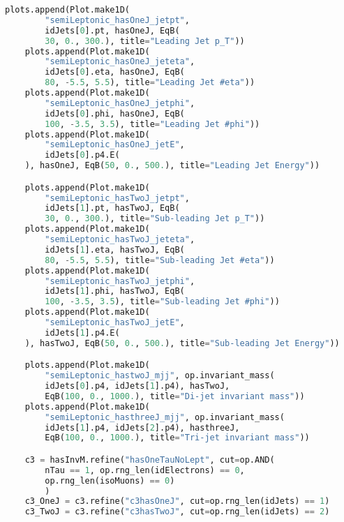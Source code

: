 \begin{lstlisting}[language=Python, caption=Python module of the analysis used in Bamboo framework, label={bamboocode}]
    plots.append(Plot.make1D(
        "semiLeptonic_hasOneJ_jetpt",
        idJets[0].pt, hasOneJ, EqB(
        30, 0., 300.), title="Leading Jet p_T"))
    plots.append(Plot.make1D(
        "semiLeptonic_hasOneJ_jeteta",
        idJets[0].eta, hasOneJ, EqB(
        80, -5.5, 5.5), title="Leading Jet #eta"))
    plots.append(Plot.make1D(
        "semiLeptonic_hasOneJ_jetphi",
        idJets[0].phi, hasOneJ, EqB(
        100, -3.5, 3.5), title="Leading Jet #phi"))
    plots.append(Plot.make1D(
        "semiLeptonic_hasOneJ_jetE",
        idJets[0].p4.E(
    ), hasOneJ, EqB(50, 0., 500.), title="Leading Jet Energy"))

    plots.append(Plot.make1D(
        "semiLeptonic_hasTwoJ_jetpt",
        idJets[1].pt, hasTwoJ, EqB(
        30, 0., 300.), title="Sub-leading Jet p_T"))
    plots.append(Plot.make1D(
        "semiLeptonic_hasTwoJ_jeteta",
        idJets[1].eta, hasTwoJ, EqB(
        80, -5.5, 5.5), title="Sub-leading Jet #eta"))
    plots.append(Plot.make1D(
        "semiLeptonic_hasTwoJ_jetphi",
        idJets[1].phi, hasTwoJ, EqB(
        100, -3.5, 3.5), title="Sub-leading Jet #phi"))
    plots.append(Plot.make1D(
        "semiLeptonic_hasTwoJ_jetE",
        idJets[1].p4.E(
    ), hasTwoJ, EqB(50, 0., 500.), title="Sub-leading Jet Energy"))

    plots.append(Plot.make1D(
        "semiLeptonic_hastwoJ_mjj", op.invariant_mass(
        idJets[0].p4, idJets[1].p4), hasTwoJ,
        EqB(100, 0., 1000.), title="Di-jet invariant mass"))
    plots.append(Plot.make1D(
        "semiLeptonic_hasthreeJ_mjj", op.invariant_mass(
        idJets[1].p4, idJets[2].p4), hasthreeJ,
        EqB(100, 0., 1000.), title="Tri-jet invariant mass"))

    c3 = hasInvM.refine("hasOneTauNoLept", cut=op.AND(
        nTau == 1, op.rng_len(idElectrons) == 0,
        op.rng_len(isoMuons) == 0)
        )
    c3_OneJ = c3.refine("c3hasOneJ", cut=op.rng_len(idJets) == 1)
    c3_TwoJ = c3.refine("c3hasTwoJ", cut=op.rng_len(idJets) == 2)


\end{lstlisting}
